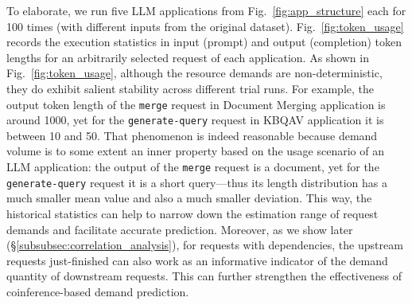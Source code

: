 To elaborate, we run five LLM applications from Fig.~\ref{fig:app_structure} each for 100 times (with different inputs from the original dataset).
Fig.~\ref{fig:token_usage} records the execution statistics in input (prompt) and output (completion) token lengths for an 
arbitrarily selected request of each application.
As shown in Fig.~\ref{fig:token_usage}, although the resource demands are non-deterministic, they do exhibit salient stability across different trial runs.
For example, the output token length of the \texttt{merge} request in Document Merging application is around 1000, yet for the \texttt{generate-query} request in KBQAV application it is between 10 and 50.
That phenomenon is indeed reasonable because demand volume is to some extent an inner property based on the usage scenario of an LLM application:
the output of the \texttt{merge} request is a document, yet for the \texttt{generate-query} request it is a short query---thus its length distribution has a much smaller mean value and also a much smaller deviation. 
This way, the historical statistics can help to narrow down the estimation range of request demands and facilitate accurate prediction. 
Moreover, as we show later (\S\ref{subsubsec:correlation_analysis}), for requests with dependencies, the upstream requests just-finished can also work as an informative indicator of the demand quantity of downstream requests.
This can further strengthen the effectiveness of coinference-based demand prediction. 

